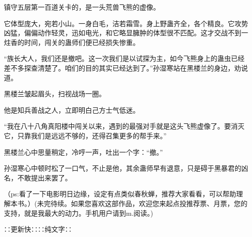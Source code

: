 \begin{this_body}
镇守五层第一百道关卡的，是一头荒兽飞熊的虚像。

它体型庞大，宛若小山。一身白毛，洁若霜雪。身上野蛊齐全，各个精良。它攻势凶猛，偏偏动作轻灵，迅如电光，和它略显臃肿的体型很不匹配。这才交战不到一炷香的时间，闯关的蛊师们便已经损失惨重。

“族长大人，我们还是撤吧。这一次我们是以试探为主，如今飞熊身上的蛊虫已经差不多探查清楚了。咱们的目的其实已经达到了。”孙湿寒站在黑楼兰的身边，劝说道。

黑楼兰皱起眉头，扫视战场一圈。

他是知兵善战之人，立即明白己方士气低迷。

“我在八十八角真阳楼中闯关以来，遇到的最强对手就是这头飞熊虚像了。要消灭它，只靠我们是远远不够的，还得召集更多的帮手来。”

黑楼兰心中思量稍定，冷哼一声，吐出一个字：“撤。”

孙湿寒心中顿时松了一口气，不止是他，其余蛊师早有退意，只是碍于黑暴君的凶名，不敢提出来罢了。

（ps:看了一下电影明日边缘，设定有点类似春秋蝉，推荐大家看看，可以帮助理解本书。）(未完待续。如果您喜欢这部作品，欢迎您来起点投推荐票、月票，您的支持，就是我最大的动力。手机用户请到m.阅读。)

∷更新快∷∷纯文字∷

\end{this_body}

